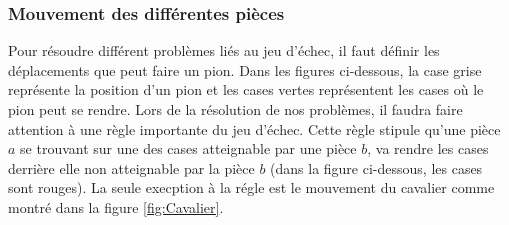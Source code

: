 \documentclass[a4paper,11pt]{article}
\begin{document}
        \subsubsection{Mouvement des différentes pièces}
            Pour résoudre différent problèmes liés au jeu d'échec, il faut définir les déplacements que peut faire un pion. Dans les figures ci-dessous, la case grise représente la position d'un pion et les cases vertes représentent les cases où le pion peut se rendre. Lors de la résolution de nos problèmes, il faudra faire attention à une règle importante du jeu d'échec. Cette règle stipule qu'une pièce $a$ se trouvant sur une des cases atteignable par une pièce $b$, va rendre les cases derrière elle non atteignable par la pièce $b$ (dans la figure ci-dessous, les cases sont rouges). La seule execption à la régle est le mouvement du cavalier comme montré dans la figure \ref{fig:Cavalier}.
\end{document}
